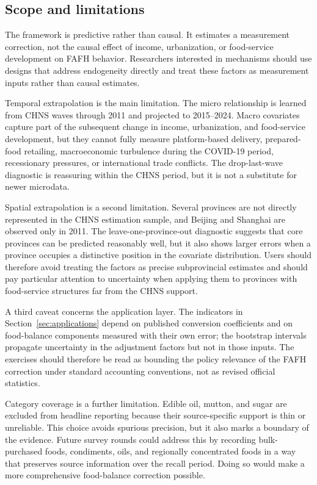 \documentclass[preprint,12pt,authoryear]{elsarticle}
\begin{document}
\subsection{Scope and limitations}
\label{subsec:limits}

The framework is predictive rather than causal. It estimates a measurement correction, not the causal effect of income, urbanization, or food-service development on FAFH behavior. Researchers interested in mechanisms should use designs that address endogeneity directly and treat these factors as measurement inputs rather than causal estimates.

Temporal extrapolation is the main limitation. The micro relationship is learned from CHNS waves through 2011 and projected to 2015--2024. Macro covariates capture part of the subsequent change in income, urbanization, and food-service development, but they cannot fully measure platform-based delivery, prepared-food retailing, macroeconomic turbulence during the COVID-19 period, recessionary pressures, or international trade conflicts. The drop-last-wave diagnostic is reassuring within the CHNS period, but it is not a substitute for newer microdata.

Spatial extrapolation is a second limitation. Several provinces are not directly represented in the CHNS estimation sample, and Beijing and Shanghai are observed only in 2011. The leave-one-province-out diagnostic suggests that core provinces can be predicted reasonably well, but it also shows larger errors when a province occupies a distinctive position in the covariate distribution. Users should therefore avoid treating the factors as precise subprovincial estimates and should pay particular attention to uncertainty when applying them to provinces with food-service structures far from the CHNS support.

A third caveat concerns the application layer. The indicators in Section~\ref{sec:applications} depend on published conversion coefficients and on food-balance components measured with their own error; the bootstrap intervals propagate uncertainty in the adjustment factors but not in those inputs. The exercises should therefore be read as bounding the policy relevance of the FAFH correction under standard accounting conventions, not as revised official statistics.

Category coverage is a further limitation. Edible oil, mutton, and sugar are excluded from headline reporting because their source-specific support is thin or unreliable. This choice avoids spurious precision, but it also marks a boundary of the evidence. Future survey rounds could address this by recording bulk-purchased foods, condiments, oils, and regionally concentrated foods in a way that preserves source information over the recall period. Doing so would make a more comprehensive food-balance correction possible.
\end{document}
